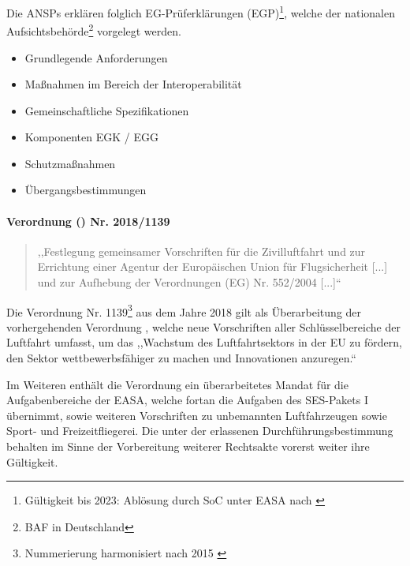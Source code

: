     Die \acp{ANSP} erklären folglich \acs{EG}-Prüferklärungen (\acs{EGP})\footnote{Gültigkeit bis 2023: Ablösung durch \ac{SoC} unter \acs{EASA} nach  \cite{2023R1769}}, welche der nationalen Aufsichtsbehörde\footnote{\acf{BAF} in Deutschland} vorgelegt werden. \cite[Art. 6 Abs. 1f]{2004R0552}

    \begin{itemize}
        \item Grundlegende Anforderungen
        \item Maßnahmen im Bereich der Interoperabilität
        \item Gemeinschaftliche Spezifikationen
        \item Komponenten \ac{EGK} / \ac{EGG}
        \item Schutzmaßnahmen
        \item Übergangsbestimmungen
    \end{itemize}

\paragraph{Verordnung () Nr. 2018/1139}
    \begin{quote}
        ,,Festlegung gemeinsamer Vorschriften für die Zivilluftfahrt und zur Errichtung einer Agentur der Europäischen Union für Flugsicherheit [...] und zur Aufhebung der Verordnungen (EG) Nr. 552/2004 [...]`` \cite{2018R1139} 
    \end{quote}

    \noindent
    Die Verordnung Nr. 1139\footnote{Nummerierung harmonisiert nach 2015 \cite{eu_number_harmony}} aus dem Jahre 2018 gilt als Überarbeitung der vorhergehenden Verordnung , welche neue Vorschriften aller Schlüsselbereiche der Luftfahrt umfasst, um das ,,Wachstum des Luftfahrtsektors in der \ac{EU} zu fördern, den Sektor wettbewerbsfähiger zu machen und Innovationen anzuregen.`` \cite{2018R1139_summary} 

    \medskip
    Im Weiteren enthält die Verordnung ein überarbeitetes Mandat für die Aufgabenbereiche der \acf{EASA}, welche fortan die Aufgaben des \ac{SES}-Pakets I übernimmt, sowie weiteren Vorschriften zu unbemannten Luftfahrzeugen sowie Sport- und Freizeitfliegerei.
    Die unter der  erlassenen Durchführungsbestimmung behalten im Sinne der Vorbereitung weiterer Rechtsakte vorerst weiter ihre Gültigkeit. \cite[ErwG. 83]{2018R1139}
    
